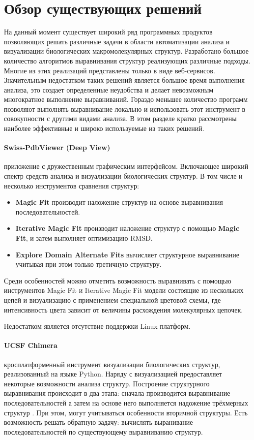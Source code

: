 \documentclass[a4paper, 12pt, titlepage, utf8]{extarticle}
\let\oldsection\section         %
\renewcommand{\section}{\newpage\oldsection}
\begin{document}
\section{Обзор существующих решений}
На данный момент существует широкий ряд программных продуктов позволяющих решать различные задачи в области автоматизации анализа и визуализации биологических макромолекулярных структур. Разработано большое количество алгоритмов выравнивания структур реализующих различные подходы. Многие из этих реализаций представлены только в виде веб-сервисов. Значительным недостатком таких решений является большое время выполнения анализа, это создает определенные неудобства и делает невозможным многократное выполнение выравниваний. Гораздо меньшее количество программ позволяют выполнять выравнивание локально и использовать этот инструмент в совокупности с другими видами анализа. В этом разделе кратко рассмотрены наиболее эффективные и широко используемые из таких решений.

\paragraph{Swiss-PdbViewer (Deep View) \cite{deep-view}}
приложение с дружественным графическим интерфейсом. Включающее широкий спектр средств анализа и визуализации биологических структур. В том числе и несколько инструментов сравнения структур:
\begin{itemize}
    \item \textbf{Magic Fit} производит наложение структур на основе выравнивания последовательностей.
    \item \textbf{Iterative Magic Fit} производит наложение структур с помощью \textbf{Magic Fit}, и затем выполняет оптимизацию RMSD.
    \item \textbf{Explore Domain Alternate Fits} вычисляет структурное выравнивание учитывая при этом только третичную структуру.
\end{itemize}

Среди особенностей можно отметить возможность выравнивать с помощью инструментов Magic Fit и Iterative Magic Fit модели состоящие из нескольких цепей и визуализацию с применением специальной цветовой схемы, где интенсивность цвета зависит от величины расхождения молекулярных цепочек.

Недостатком является отсутствие поддержки Linux платформ.

\paragraph{UCSF Chimera \cite{chimera}}
кросплатформенный инструмент визуализации биологических структур, реализованный на языке Python. Наряду с визуализацией предоставляет некоторые возможности анализа структур. Построение структурного выравнивания происходит в два этапа: сначала производится выравнивание последовательностей а затем на основе него выполняется надожение трёхмерных структур \cite{chimera-alignment}. При этом, могут учитываться особенности вторичной структуры. Есть возможность решать обратную задачу: вычислять выранивание последовательностей по существующему выравниванию структур.
\end{document}
